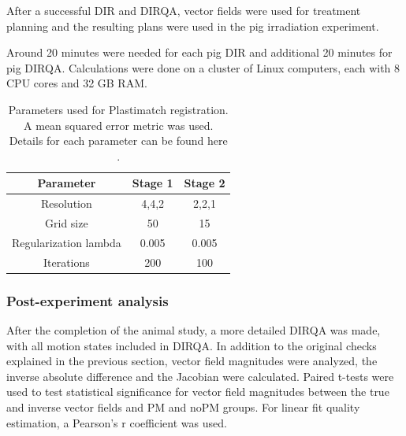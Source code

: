 After a successful DIR and DIRQA, vector fields were used for treatment planning and the resulting plans were used in the pig irradiation experiment.

Around 20 minutes were needed for each pig DIR and additional 20 minutes for pig DIRQA. Calculations were done on a cluster of Linux computers, each with 8 CPU cores and 32 GB RAM.

\begin{table}[H]
  \centering
  \caption{Parameters used for Plastimatch registration.  A mean squared error metric was used. Details for each parameter can be found here \cite{Plastimatch}.}
  \begin{tabular}{|c|c|c|}
  \hline\hline
      Parameter & Stage 1 & Stage 2 \\
      \hline
      Resolution & 4,4,2 & 2,2,1 \\
      Grid size & 50 & 15 \\
      Regularization lambda & 0.005 & 0.005 \\
      Iterations & 200 & 100 \\
    \hline\hline
  \end{tabular}
  \label{tab:stages2}
\end{table}

\subsubsection{Post-experiment analysis}

After the completion of the animal study, a more detailed DIRQA was made, with all motion states included in DIRQA. In addition to the original checks explained in the previous section, vector field magnitudes were analyzed, 
the inverse absolute difference and the Jacobian were calculated. Paired t-tests were used to test statistical significance for vector field magnitudes between the true and inverse vector fields and PM and noPM groups. For linear fit quality estimation, 
a Pearson's r coefficient was used.

